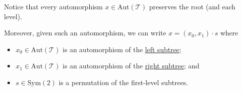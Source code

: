 \documentclass[aspectratio=169,10pt]{beamer}
\renewcommand{\emph}[1]{\textit{\bfseries{\color{OwlYellow}#1}}}
\begin{document}
\begin{frame}
\begin{center}
  \end{center}

  Notice that every automorphism $x \in \mathrm{Aut}(\mathcal T)$ preserves the root (and each level).

  Moreover, given such an automorphism, we can write \emph{$x = (x_0,x_1)\cdot s$} where
  \vspace{-0.7em}\begin{itemize}\setlength\itemsep{-0.7em}
    \item \emph{$x_0 \in \mathrm{Aut}(\mathcal T)$} is an automorphism of the \underline{left subtree};
    \item \emph{$x_1 \in \mathrm{Aut}(\mathcal T)$} is an automorphism of the \underline{right subtree}; and
    \item \emph{$s \in \mathrm{Sym}(2)$} is a permutation of the first-level subtrees.
  \end{itemize}

\end{frame}


\end{document}
